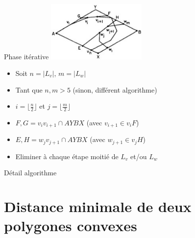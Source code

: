 \documentclass{beamer}
\begin{document}
\begin{frame}{Phase itérative}
	\includegraphics[height=3cm]{igg1.jpg}
	\begin{itemize}
	\item Soit $n = |L_{v}|$, $m = |L_{w}|$
	\item Tant que $n, m > 5$ (sinon, différent algorithme)
	\item $i = \lfloor \frac{n}{2} \rfloor$ et $j = \lfloor \frac{m}{2} \rfloor$
	\item $F, G = v_{i}v_{i+1} \cap AYBX$ (avec $v_{i+1} \in v_{i}F$)
	\item $E, H = w_{j}v_{j+1} \cap AYBX$ (avec $w_{j+1} \in v_{j}H$)
	\item Eliminer à chaque étape moitié de $L_v$ et/ou $L_w$
	\end{itemize}
\end{frame}

\begin{frame}
	\Large{Détail algorithme}
\end{frame}

\section{Distance minimale de deux polygones convexes}
\end{document}
